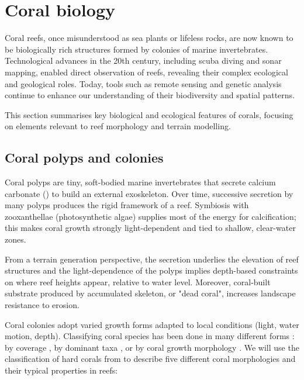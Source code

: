 

\section{Coral biology}
\label{sec:state-of-the-art_biology}

Coral reefs, once misunderstood as sea plants or lifeless rocks, are now known to be biologically rich structures formed by colonies of marine invertebrates. Technological advances in the 20th century, including scuba diving and sonar mapping, enabled direct observation of reefs, revealing their complex ecological and geological roles. Today, tools such as remote sensing and genetic analysis continue to enhance our understanding of their biodiversity and spatial patterns.

This section summarises key biological and ecological features of corals, focusing on elements relevant to reef morphology and terrain modelling.

\subsection{Coral polyps and colonies}
Coral polyps are tiny, soft-bodied marine invertebrates that secrete calcium carbonate () to build an external exoskeleton. Over time, successive secretion by many polyps produces the rigid framework of a reef. Symbiosis with zooxanthellae (photosynthetic algae) supplies most of the energy for calcification; this makes coral growth strongly light-dependent and tied to shallow, clear-water zones.

From a terrain generation perspective, the  secretion underlies the elevation of reef structures and the light-dependence of the polyps implies depth-based constraints on where reef heights appear, relative to water level. Moreover, coral-built substrate produced by accumulated skeleton, or "dead coral", increases landscape resistance to erosion.

Coral colonies adopt varied growth forms adapted to local conditions (light, water motion, depth). Classifying coral species has been done in many different forms \cite{Kovacs2020}: by coverage \cite{Kuchler1986, Bauer2009, Purkis2019}, by dominant taxa \cite{Stoddart1969}, or by coral growth morphology \cite{Mumby1999,Goltenboth2006}. We will use the classification of hard corals from \cite{Goltenboth2006} to describe five different coral morphologies and their typical properties in reefs:

